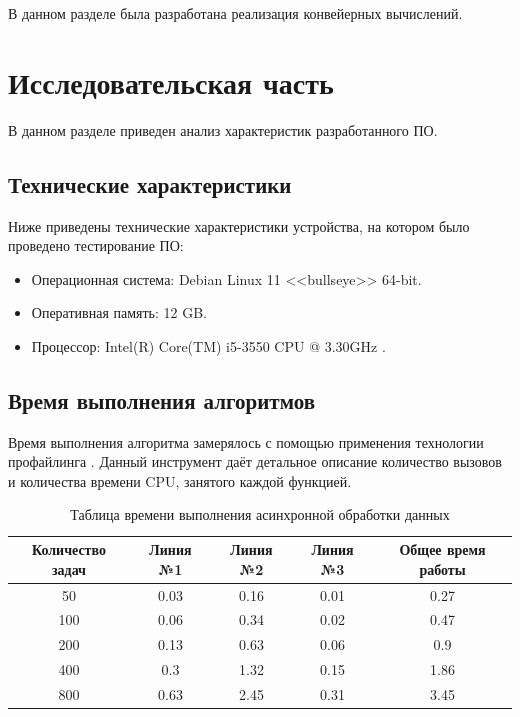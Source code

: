 \documentclass[12pt]{report}
\begin{document}
В данном разделе была разработана реализация конвейерных вычислений.

\chapter{Исследовательская часть}

В данном разделе приведен анализ характеристик разработанного ПО.

\section{Технические характеристики}

Ниже приведены технические характеристики устройства, на котором было проведено тестирование ПО:

\begin{itemize}
	\item Операционная система: Debian \cite{debian} Linux \cite{linux} 11 <<bullseye>> 64-bit.
	\item Оперативная память: 12 GB.
	\item Процессор: Intel(R) Core(TM) i5-3550 CPU @ 3.30GHz
\cite{i5}.

\end{itemize}

\section{Время выполнения алгоритмов}

Время выполнения алгоритма замерялось с помощью применения технологии профайлинга \cite{profiling}. Данный инструмент даёт детальное описание количество вызовов и количества времени CPU, занятого каждой функцией.

\begin{table} [h!]
	\caption{Таблица времени выполнения асинхронной обработки данных}
	\begin{center}
		\begin{tabular}{|c c c c c|} 
		 	\hline
			Количество задач & Линия №1 & Линия №2 & Линия №3 & Общее время работы  \\  
		 	\hline
		 	50 & 0.03 & 0.16 & 0.01 & 0.27 \\
		 	\hline
		 	100 & 0.06 & 0.34 & 0.02 & 0.47 \\
		 	\hline
		 	200 & 0.13 & 0.63 & 0.06 & 0.9 \\
		 	\hline
			400 & 0.3 & 1.32 & 0.15 & 1.86 \\
			\hline
			800 & 0.63  & 2.45 & 0.31 & 3.45 \\
			\hline
		\end{tabular}
	\end{center}
\end{table}
\end{document}
